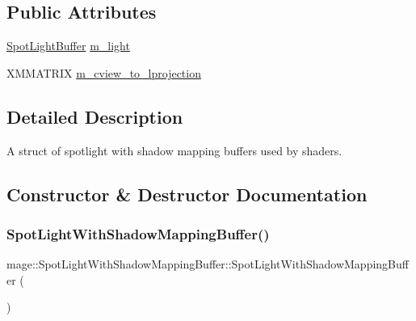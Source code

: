 \subsection*{Public Attributes}
\begin{DoxyCompactItemize}
\item 
\hyperlink{structmage_1_1_spot_light_buffer}{Spot\+Light\+Buffer} \hyperlink{structmage_1_1_spot_light_with_shadow_mapping_buffer_adf2a7b3790e5ca40141a3bfbd9de19bb}{m\+\_\+light}
\item 
X\+M\+M\+A\+T\+R\+IX \hyperlink{structmage_1_1_spot_light_with_shadow_mapping_buffer_a9f265c3662e441dc1d32dd793198ca5f}{m\+\_\+cview\+\_\+to\+\_\+lprojection}
\end{DoxyCompactItemize}


\subsection{Detailed Description}
A struct of spotlight with shadow mapping buffers used by shaders. 

\subsection{Constructor \& Destructor Documentation}
\hypertarget{structmage_1_1_spot_light_with_shadow_mapping_buffer_a2733e7c1041dd80bd6024197d6ec8910}{}\label{structmage_1_1_spot_light_with_shadow_mapping_buffer_a2733e7c1041dd80bd6024197d6ec8910} 
\subsubsection{\texorpdfstring{Spot\+Light\+With\+Shadow\+Mapping\+Buffer()}{SpotLightWithShadowMappingBuffer()}\hspace{0.1cm}{\footnotesize\ttfamily [1/3]}}
{\footnotesize\ttfamily mage\+::\+Spot\+Light\+With\+Shadow\+Mapping\+Buffer\+::\+Spot\+Light\+With\+Shadow\+Mapping\+Buffer (\begin{DoxyParamCaption}{ }\end{DoxyParamCaption})\hspace{0.3cm}{\ttfamily [noexcept]}}

